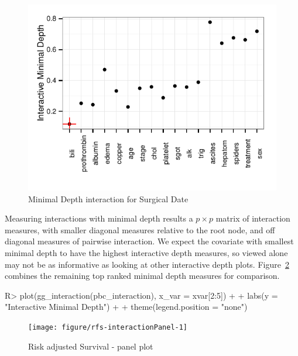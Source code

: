 \documentclass[nojss]{jss}\usepackage[]{graphicx}\usepackage[]{color}
\makeatletter
\def\maxwidth{ %
  \ifdim\Gin@nat@width>\linewidth
    \linewidth
  \else
    \Gin@nat@width
  \fi
}
\makeatother
\begin{document}
\begin{Schunk}
\begin{figure}[!htpb]

{\centering \includegraphics[width=\maxwidth]{figure/rfs-interaction-1} 

}

\caption[Minimal Depth interaction for Surgical Date]{Minimal Depth interaction for Surgical Date\label{fig:interaction}}
\end{figure}
\end{Schunk}

Measuring interactions with minimal depth results a $p \times p$ matrix of interaction measures, with smaller diagonal measures relative to the root node, and off diagonal measures of pairwise interaction. We expect the covariate with smallest minimal depth to have the highest interactive depth measures, so viewed alone may not be as informative as looking at other interactive depth plots. Figure~\ref{fig:interactionPanel} combines the remaining top ranked minimal depth measures for comparison.
\begin{Schunk}
\begin{Sinput}
R> plot(gg_interaction(pbc_interaction), x_var = xvar[2:5]) + 
+   labs(y = "Interactive Minimal Depth") + 
+   theme(legend.position = "none")
\end{Sinput}
\begin{figure}[!htpb]

{\centering \texttt{[image: figure/rfs-interactionPanel-1]} 

}

\caption[Risk adjusted Survival - panel plot]{Risk adjusted Survival - panel plot\label{fig:interactionPanel}}
\end{figure}
\end{Schunk}
\end{document}
